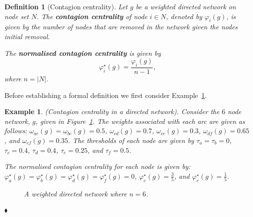 \documentclass[11pt,fleqn]{article}
\newtheorem{definition}[theorem]{Definition}
\newtheorem{expl}[theorem]{Example}
\newenvironment{example}{\begin{expl} \rm}{\hfill $\blacklozenge$ \end{expl}}{}
\begin{document}
\begin{definition}[Contagion centrality]
Let $g$ be a weighted directed network on node set $N$. The \textbf{contagion centrality} of node $i \in N$, denoted by $\varphi_{i}(g)$, is given by the number of nodes that are removed in the network given the nodes initial removal.

The \textbf{normalised contagion centrality} is given by
\begin{equation}
\varphi^{\star}_{i}(g) = \frac{\varphi_{i}(g)}{n - 1},
\end{equation}
where $n = |N|$.
\end{definition}

Before establishing a formal definition we first consider Example~\ref{ex:contagionCentrality}.

\begin{example} \label{ex:contagionCentrality}
(Contagion centrality in a directed network).
Consider the $6$ node network, $g$, given in Figure~\ref{fig:flowNetwork}. The weights associated with each arc are given as follows: $\omega_{ac}(g) = \omega_{bc}(g) = 0.5$, $\omega_{cd}(g) = 0.7$, $\omega_{ce}(g) = 0.3$, $\omega_{df}(g) = 0.65$, and $\omega_{ef}(g) = 0.35$. The thresholds of each node are given by $\tau_{a} = \tau_{b} = 0$, $\tau_{c} = 0.4$, $\tau_{d} = 0.4$, $\tau_{e} = 0.25$, and $\tau_{f} = 0.5$.

The normalised contagion centrality for each node is given by: $\varphi^{\star}_{a}(g) = \varphi^{\star}_{b}(g) = \varphi^{\star}_{d}(g) = \varphi^{\star}_{f}(g) = 0$, $\varphi^{\star}_{c}(g) = \frac{3}{5}$, and $\varphi^{\star}_{e}(g) = \frac{1}{5}$.

\begin{figure}[t]
\begin{center}
\end{center}
\caption{A weighted directed network where $n = 6$.}
\label{fig:flowNetwork}
\end{figure}
\end{example}
\end{document}
